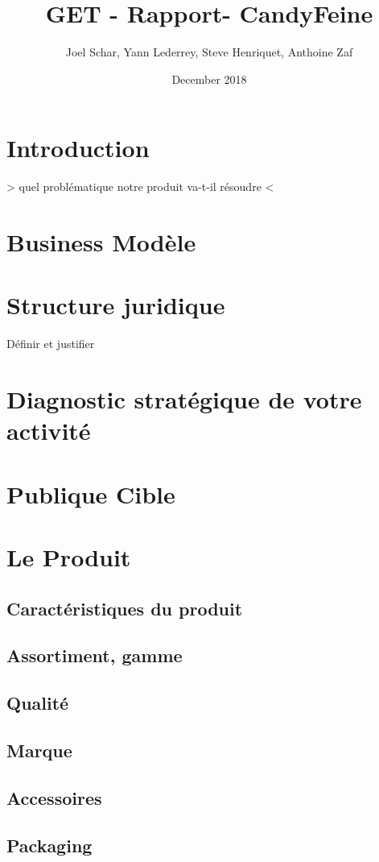 \documentclass{article}
\title{GET - Rapport- CandyFeine}
\author{Joel Schar, Yann Lederrey, Steve Henriquet, Anthoine Zaf }
\date{December 2018}
\begin{document}
\maketitle

\section{Introduction}
> quel problématique notre produit va-t-il résoudre <

\section{Business Modèle}

\section{Structure juridique}
Définir et justifier

\section{Diagnostic stratégique de votre activité}

\section{Publique Cible}

\section{Le Produit}
\subsection{Caractéristiques du produit}
\subsection{Assortiment, gamme}
\subsection{Qualité}
\subsection{Marque}
\subsection{Accessoires}
\subsection{Packaging}
\end{document}

